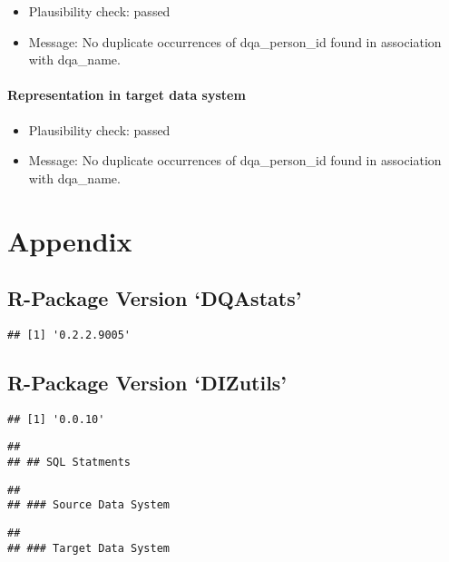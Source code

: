\documentclass[
]{article}
\providecommand{\tightlist}{%
  \setlength{\itemsep}{0pt}\setlength{\parskip}{0pt}}
\begin{document}
\begin{itemize}
\tightlist
\item
  Plausibility check: passed
\item
  Message: No duplicate occurrences of dqa\_person\_id found in
  association with dqa\_name.
\end{itemize}

\hypertarget{representation-in-target-data-system-13}{%
\paragraph{Representation in target data
system}\label{representation-in-target-data-system-13}}

\begin{itemize}
\tightlist
\item
  Plausibility check: passed
\item
  Message: No duplicate occurrences of dqa\_person\_id found in
  association with dqa\_name.
\end{itemize}

\newpage

\hypertarget{appendix}{%
\section{Appendix}\label{appendix}}

\hypertarget{r-package-version-dqastats}{%
\subsection{R-Package Version
`DQAstats'}\label{r-package-version-dqastats}}

\begin{verbatim}
## [1] '0.2.2.9005'
\end{verbatim}

\hypertarget{r-package-version-dizutils}{%
\subsection{R-Package Version
`DIZutils'}\label{r-package-version-dizutils}}

\begin{verbatim}
## [1] '0.0.10'
\end{verbatim}

\begin{verbatim}
## 
## ## SQL Statments
\end{verbatim}

\begin{verbatim}
## 
## ### Source Data System
\end{verbatim}

\begin{verbatim}
## 
## ### Target Data System
\end{verbatim}
\end{document}
